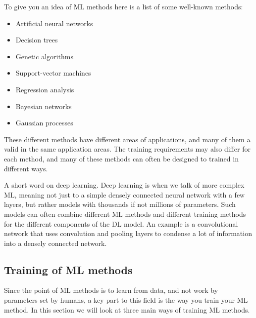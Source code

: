 \documentclass[12pt,a4paper]{article} %
\numberwithin{equation}{section}
\begin{document}
		To give you an idea of ML methods here is a list of some well-known methods:
		\begin{itemize}
			\item Artificial neural networks
			\item Decision trees
			\item Genetic algorithms
			\item Support-vector machines
			\item Regression analysis
			\item Bayesian networks
			\item Gaussian processes			
		\end{itemize}
		These different methods have different areas of applications, and many of them a valid in the same application areas. The training requirements may also differ for each method, and many of these methods can often be designed to trained in different ways.
		
		A short word on deep learning. Deep learning is when we talk of more complex ML, meaning not just to a simple densely connected neural network with a few layers, but rather models with thousands if not millions of parameters. Such models can often combine different ML methods and different training methods for the different components of the DL model. An example is a convolutional network that uses convolution and pooling layers to condense a lot of information into a densely connected network.
	
	\subsection{Training of ML methods}
		Since the point of ML methods is to learn from data, and not work by parameters set by humans, a key part to this field is the way you train your ML method. In this section we will look at three main ways of training ML methods.
		
\end{document}
